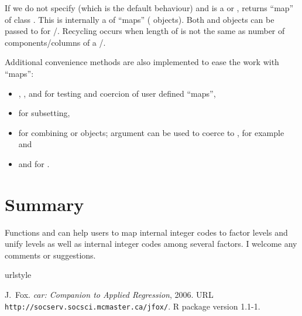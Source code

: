 \documentclass[a4paper]{report}
\begin{document}
\begin{article}
If we do not specify  (which is the default behaviour)
and  is a  or , 
returns ``map'' of class . This is internally a
 of ``maps'' ( objects). Both
 and  objects can be passed to
 for /. Recycling occurs when
length of  is not the same as number of
components/columns of a /.

Additional convenience methods are also implemented to ease the work with
``maps'':

\begin{itemize}

\item {}, ,  and
   for testing and coercion of user defined
  ``maps'',

\item \code{"["} for subsetting,

\item {} for combining  or 
  objects; argument  can be used to coerce
   to , for example  and

\item {} and  for .

\end{itemize}

\section{Summary}

Functions  and  can help users to map
internal integer codes to factor levels and unify levels as well as
internal integer codes among several factors. I welcome any comments or
suggestions.

% 
\begin{thebibliography}{1}
\providecommand{\natexlab}[1]{#1}
\providecommand{\url}[1]{\texttt{#1}}
\expandafter\ifx\csname urlstyle\endcsname\relax
  \providecommand{\doi}[1]{doi: #1}\else
  \providecommand{\doi}{doi: \begingroup \urlstyle{rm}\Url}\fi

J.~Fox.
\newblock \emph{car: Companion to Applied Regression}, 2006.
\newblock URL \url{http://socserv.socsci.mcmaster.ca/jfox/}.
\newblock R package version 1.1-1.


\end{thebibliography}
\end{article}
\end{document}
